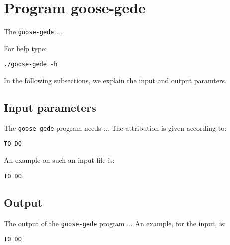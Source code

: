\section{Program goose-gede}
The \texttt{goose-gede} ...

For help type:
\begin{lstlisting}
./goose-gede -h
\end{lstlisting}
In the following subsections, we explain the input and output paramters.

\subsection{Input parameters}

The \texttt{goose-gede} program needs ...
The attribution is given according to:
\begin{lstlisting}
TO DO
\end{lstlisting}

An example on such an input file is:
\begin{lstlisting}
TO DO
\end{lstlisting}

\subsection{Output}
The output of the \texttt{goose-gede} program ...
An example, for the input, is:
\begin{lstlisting}
TO DO
\end{lstlisting}